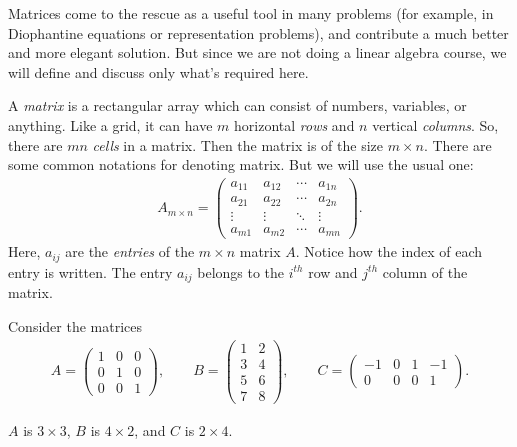\documentclass{subfile}
\begin{document}
	Matrices come to the rescue as a useful tool in many problems (for example, in Diophantine equations or representation problems), and contribute a much better and more elegant solution. But since we are not doing a linear algebra course, we will define and discuss only what's required here.

	\begin{definition}[Matrix]
		A \textit{matrix} is a rectangular array which can consist of numbers, variables, or anything. Like a grid, it can have $m$ horizontal \textit{rows} and $n$ vertical \textit{columns}. So, there are $mn$ \textit{cells} in a matrix. Then the matrix is of the size $m\times n$. There are some common notations for denoting matrix. But we will use the usual one:
		\begin{align*}
		{A_{m \times n}} = \begin{pmatrix}
			{{a_{11}}}&{{a_{12}}}& \cdots &{{a_{1n}}}\\
			{{a_{21}}}&{{a_{22}}}& \cdots &{{a_{2n}}}\\
			\vdots & \vdots & \ddots & \vdots \\
			{{a_{m1}}}&{{a_{m2}}}& \cdots &{{a_{mn}}}
			\end{pmatrix}.
			\end{align*}
		Here, $a_{ij}$ are the \textit{entries} of the $m\times n$ matrix $A$. Notice how the index of each entry is written. The entry $a_{ij}$ belongs to the $i^{th}$ row and $j^{th}$ column of the matrix.
	\end{definition}

	\begin{example}
	Consider the matrices
		\begin{align*}
		A = \begin{pmatrix}
			1&0&0\\
			0&1&0\\
			0&0&1
			\end{pmatrix},\qquad B = \begin{pmatrix}
			1&2\\
			3&4\\
			5&6\\
			7&8
			\end{pmatrix},\qquad C = \begin{pmatrix}
			{ - 1}&0&1&{ - 1}\\
			0&0&0&1
			\end{pmatrix}.
		\end{align*}

	$A$ is $3\times 3$, $B$ is $4\times 2$, and $C$ is $2 \times 4$.
	\end{example}
\end{document}
